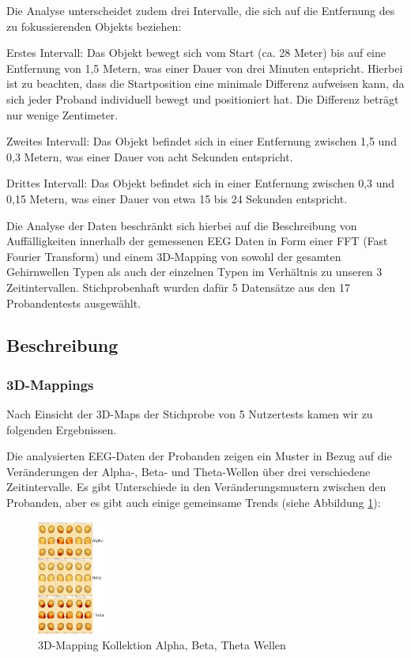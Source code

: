 \documentclass[conference]{IEEEtran}
\begin{document}
Die Analyse unterscheidet zudem drei Intervalle, die sich auf die Entfernung des zu fokussierenden Objekts beziehen:

\begin{myitemize}
    \item Erstes Intervall: Das Objekt bewegt sich vom Start (ca. 28 Meter) bis auf eine Entfernung von 1,5 Metern, was einer Dauer von drei Minuten entspricht. Hierbei ist zu beachten, dass die Startposition eine minimale Differenz aufweisen kann, da sich jeder Proband individuell bewegt und positioniert hat. Die Differenz beträgt nur wenige Zentimeter.
    \item Zweites Intervall: Das Objekt befindet sich in einer Entfernung zwischen 1,5 und 0,3 Metern, was einer Dauer von acht Sekunden entspricht.
    \item Drittes Intervall: Das Objekt befindet sich in einer Entfernung zwischen 0,3 und 0,15 Metern, was einer Dauer von etwa 15 bis 24 Sekunden entspricht.
\end{myitemize}

Die Analyse der Daten beschränkt sich hierbei auf die Beschreibung von Auffälligkeiten innerhalb der gemessenen EEG Daten in Form einer FFT (Fast Fourier Transform) und einem 3D-Mapping von sowohl der gesamten Gehirnwellen Typen als auch der einzelnen Typen im Verhältnis zu unseren 3 Zeitintervallen. Stichprobenhaft wurden dafür 5 Datensätze aus den 17 Probandentests ausgewählt. 
\subsection{Beschreibung}

\subsubsection{3D-Mappings}

Nach Einsicht der 3D-Maps der Stichprobe von 5 Nutzertests kamen wir zu folgenden Ergebnissen.

Die analysierten EEG-Daten der Probanden zeigen ein Muster in Bezug auf die Veränderungen der Alpha-, Beta- und Theta-Wellen über drei verschiedene Zeitintervalle. Es gibt Unterschiede in den Veränderungsmustern zwischen den Probanden, aber es gibt auch einige gemeinsame Trends (siehe Abbildung \ref{fig:3D_Mapping_Collection}):

\begin{figure}[ht]
	\centering
	\includegraphics[width=0.2\textwidth]{assets/Collection3DMapping.jpg} \hspace{-5pt}
	\caption{3D-Mapping Kollektion Alpha, Beta, Theta Wellen}
	\label{fig:3D_Mapping_Collection}
\end{figure}
\end{document}
